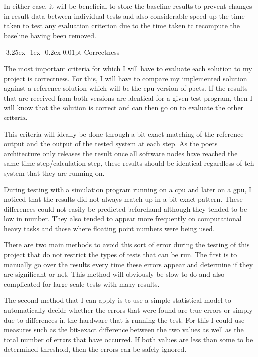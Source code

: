 \documentclass[paper=a4, fontsize=11pt, bibliography=totocnumbered]{scrartcl}
\makeatletter
\renewcommand\paragraph{\@startsection{paragraph}{4}{\z@}%
  {-3.25ex \@plus -1ex \@minus -0.2ex}%
  {0.01pt}%
  {\raggedsection\normalfont\sectfont\nobreak\size@paragraph}%
}
\numberwithin{equation}{section}		%
\numberwithin{figure}{section}			%
\numberwithin{table}{section}				%
\makeatother
\begin{document}
In either case, it will be beneficial to store the baseline results to prevent changes in result data between individual tests and also considerable speed up the time taken to test any evaluation criterion due to the time taken to recompute the baseline having been removed.


\paragraph{Correctness}

The most important criteria for which I will have to evaluate each solution to my project is correctness. For this, I will have to compare my implemented solution against a reference solution which will be the \gls{cpu} version of \gls{poets}. If the results that are received from both versions are identical for a given test program, then I will know that the solution is correct and can then go on to evaluate the other criteria.

This criteria will ideally be done through a \gls{bit-exact} matching of the reference output and the output of the tested system at each step. As the \gls{poets} architecture only releases the result once all \glspl{software node} have reached the same time step/calculation step, these results should be identical regardless of teh system that they are running on.

During testing with a simulation program running on a \gls{cpu} and later on a \gls{gpu}, I noticed that the results did not always match up in a \gls{bit-exact} pattern. These differences could not easily be predicted beforehand although they tended to be low in number. They also tended to appear more frequently on computational heavy tasks and those where floating point numbers were being used.

There are two main methods to avoid this sort of error during the testing of this project that do not restrict the types of tests that can be run. The first is to manually go over the results every time these errors appear and determine if they are significant or not. This method will obviously be slow to do and also complicated for large scale tests with many results.

The second method that I can apply is to use a simple statistical model to automatically decide whether the errors that were found are true errors or simply due to differences in the hardware that is running the test. For this I could use measures such as the \gls{bit-exact} difference between the two values as well as the total number of errors that have occurred. If both values are less than some to be determined threshold, then the errors can be safely ignored.
\end{document}
